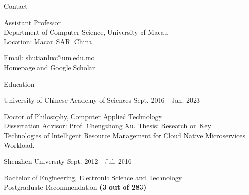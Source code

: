 \documentclass{resume} %
\providecommand*\email[1]{\href{mailto:#1}{#1}}
\begin{document}
\vspace{-3.5em}

\begin{rSection}{Contact}
\begin{minipage}[t]{0.59\textwidth}
Assistant Professor \\
Department of Computer Science, University of Macau \\
Location: Macau SAR, China
\end{minipage}
\begin{minipage}[t]{0.35\textwidth}
  Email: \email{shutianluo@um.edu.mo} \\
  \href{https://shutianluo.github.io/}{Homepage} and \href{https://scholar.google.com/citations?user=-V3ekXkAAAAJ&hl=en&oi=ao}{Google Scholar}
\end{minipage}
\end{rSection}
\vspace{-1.5em}

\begin{rSection}{Education}
\begin{rSubsection}{University of Chinese Academy of Sciences
  }{Sept. 2016 - {Jan. 2023}} {}{}
\item[] Doctor of Philosophy, Computer Applied Technology \\
Dissertation Advisor: Prof. \href{https://www.fst.um.edu.mo/personal/czxu/}
                   {Chengzhong Xu}.
                   Thesis: Research on Key Technologies of Intelligent Resource Management for Cloud Native Microservices Workload.
\end{rSubsection} 

\vspace{-0.5em}
\begin{rSubsection}{Shenzhen University} {Sept. 2012 - Jul. 2016}{}{}
\item[]  
Bachelor of Engineering, Electronic Science and Technology\\
{Postgraduate Recommendation} 
\textbf{(3 out of 283)} \\
\end{rSubsection}
\vspace{-1em}
\end{rSection}
\vspace{-1.5em}
\end{document}
